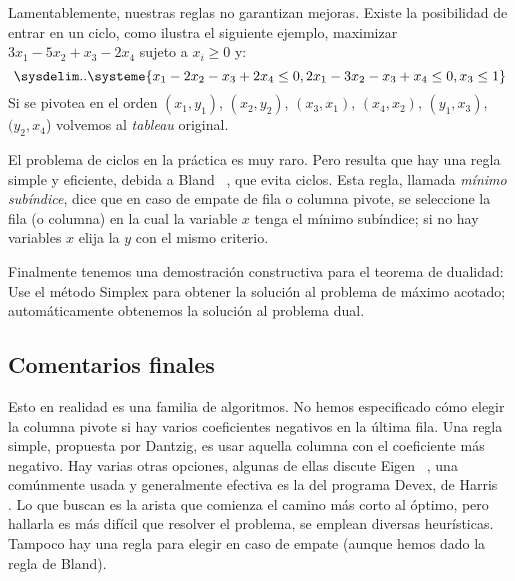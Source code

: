   Lamentablemente,
  nuestras reglas no garantizan mejoras.
  Existe la posibilidad de entrar en un ciclo,
  como ilustra el siguiente ejemplo,
  maximizar \(3 x_1 - 5 x_2 + x_3 - 2 x_4\) sujeto a \(x_i \ge 0\) y:
  \begin{equation}
    \label{eq:simplex-cycle}
    \sysdelim..
    \systeme{
        x_1 - 2 x_2 - x_3 + 2 x_4 \leq 0,
      2 x_1 - 3 x_2 - x_3 +   x_4 \leq 0,
                      x_3	  \leq 1
    }
  \end{equation}
  Si se pivotea en el orden \((x_1, y_1)\),
  \((x_2, y_2)\),
  \((x_3, x_1)\),
  \((x_4, x_2)\),
  \((y_1, x_3)\),
  \((y_2, x_4\))
  volvemos al \emph{\foreignlanguage{french}{tableau}} original.

  El problema de ciclos en la práctica es muy raro.
  Pero resulta que hay una regla simple y eficiente,
  debida a Bland~%
    \cite{bland77:_new_finite_pivot_rules_simplex_method},
  que evita ciclos.
  Esta regla,
  llamada \emph{mínimo subíndice},
  dice que en caso de empate de fila o columna pivote,
  se seleccione la fila (o columna)
  en la cual la variable \(x\) tenga el mínimo subíndice;
  si no hay variables \(x\) elija la \(y\) con el mismo criterio.

  Finalmente tenemos una demostración constructiva para el teorema de dualidad:
  Use el método Simplex
  para obtener la solución al problema de máximo acotado;
  automáticamente obtenemos la solución al problema dual.

\subsection{Comentarios finales}
\label{sec:comentarios-simplex}

  Esto en realidad es una familia de algoritmos.
  No hemos especificado cómo elegir la columna pivote
  si hay varios coeficientes negativos en la última fila.
  Una regla simple,
  propuesta por Dantzig,
  es usar aquella columna con el coeficiente más negativo.
  Hay varias otras opciones,
  algunas de ellas discute Eigen~%
    \cite{eigen11:_pivot_rules_simplex_method},
  una comúnmente usada y generalmente efectiva
  es la del programa Devex,
  de Harris~%
    \cite{harris73:_pivot_selec_metod_devex_lp_code}.
  Lo que buscan es la arista que comienza el camino más corto
  al óptimo,
  pero hallarla es más difícil que resolver el problema,
  se emplean diversas heurísticas.
  Tampoco hay una regla para elegir en caso de empate
  (aunque hemos dado la regla de Bland).

